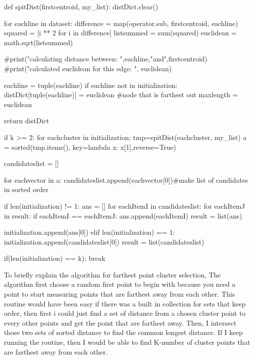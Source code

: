 \documentclass{article}
\begin{document}
\begin{python}
def spitDist(firstcentroid, my_list):
    distDict.clear()
    
    for eachline in dataset:
        difference = map(operator.sub, firstcentroid, eachline)
        squared = [i ** 2 for i in difference]
        listsummed = sum(squared)
        euclidean = math.sqrt(listsummed)
    
        #print("calculating distance between: ",eachline,"and",firstcentroid)
        #print("calculated euclidean for this edge: ", euclidean)
        
        eachline = tuple(eachline)
        if eachline not in initialization:
            distDict[tuple(eachline)] = euclidean #node that is farthest out
            maxlength = euclidean
        
    return distDict

if k >= 2:
    for eachcluster in initialization:
        tmp=spitDist(eachcluster, my_list)
        a = sorted(tmp.items(), key=lambda x: x[1],reverse=True)
            
        candidateslist = []
            
        for eachvector in a:
            candidateslist.append(eachvector[0])#make list of candidates in sorted order
            
        if len(initialization) != 1:
            ans = []
            for eachItemI in candidateslist:
                for eachItemJ in result:
                    if eachItemI == eachItemJ:
                        ans.append(eachItemI)
            result = list(ans)

            initialization.append(ans[0])
        elif len(initialization) == 1:
            initialization.append(candidateslist[0])
            result = list(candidateslist)

        if(len(initialization) == k):
            break
\end{python}
To briefly explain the algorithm for farthest point cluster selection, The algorithm first choose a random first point to begin with because you need a point to start measuring points that are farthest away from each other.  This routine would have been easy if there was a built in collection for sets that keep order, then first i could just find a set of distance from a chosen cluster point to every other points and get the point that are farthest away. Then, I intersect those two sets of sorted distance to find the common longest distance. If I keep running the routine, then I would be able to find K-number of cluster points that are farthest away from each other. 
    \newpage
\end{document}
